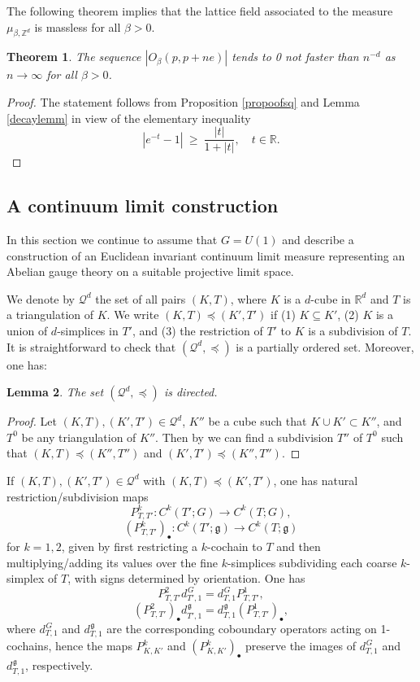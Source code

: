 \documentclass[11pt,reqno]{amsart}
\numberwithin{equation}{section}
\newtheorem{theorem}{Theorem}[section]
\newtheorem{lemma}[theorem]{Lemma}
\theoremstyle{remark}
\theoremstyle{rmdefinition}
\newcommand{\R}{{\mathbb R}}
\begin{document}
The following theorem implies that the lattice field associated to the measure $\mu_{\beta, \mathbb{Z}^d}$ is massless for all $\beta>0$.
\begin{theorem}\label{masslessth}
The sequence $|O_{\beta}(p,p+ne)|$ tends to 0 not faster than $n^{-d}$ as $n \to \infty$ for all $\beta>0$.
\end{theorem}
\begin{proof}
The statement follows from Proposition \ref{propoofsq} and Lemma \ref{decaylemm} in view of the elementary inequality
$$|e^{-t}-1|\ \ge\ \frac{|t|}{1+|t|},\quad t\in\mathbb{R}.$$
\end{proof}
	
\subsection{A continuum limit construction}
In this section we continue to assume that $G=U(1)$ and describe a construction of an Euclidean invariant continuum limit measure representing an Abelian gauge theory on a suitable projective limit space.

We denote by $\mathcal{Q}^d$ the set of all pairs $(K,T)$, where $K$ is a $d$-cube in $\R^d$ and $T$ is a triangulation of $K$. We write $(K,T)\preceq (K',T')$ if (1) $K \subseteq K'$, (2) $K$ is a union of $d$-simplices in $T'$, and (3) the restriction of $T'$ to $K$ is a subdivision of $T$. It is straightforward to check that $(\mathcal{Q}^d,\preceq)$ is a partially ordered set. Moreover, one has:
\begin{lemma}
The set $(\mathcal{Q}^d,\preceq)$ is directed.
\end{lemma}
\begin{proof}
Let $(K,T), (K',T') \in \mathcal{Q}^d$, $K''$ be a cube such that $K \cup K ' \subset K''$, and $T^0$ be any triangulation of $K''$. Then by \cite[Addendum 2.12]{RS} we can find a subdivision $T''$ of $T^0$ such that 
$(K,T)\preceq (K'',T'')$ and $(K',T')\preceq (K'',T'')$.
\end{proof}
If $(K,T), (K',T') \in \mathcal{Q}^d$ with $(K,T)\preceq (K',T')$, one has natural restriction/subdivision maps
$$ P^k_{T,T'}: C^k(T';G) \to C^k(T;G), $$
$$ (P^k_{T,T'})_{\bullet}: C^k(T';\mathfrak{g}) \to C^k(T;\mathfrak{g})$$
for $k=1,2$, given by first restricting a $k$-cochain to $T$ and then  multiplying/adding its values over the fine \(k\)-simplices subdividing each coarse \(k\)-simplex of \(T\), with signs determined by orientation. 
One has
$$P^2_{T,T'} d_{T',1}^{\hspace{1pt}G}=   d_{T,1}^{\hspace{1pt}G}P^1_{T,T'},$$
$$(P^2_{T,T'})_{\bullet}d_{T',1}^{\hspace{1pt}\mathfrak g}=d_{T,1}^{\hspace{1pt}\mathfrak g}(P^1_{T,T'})_{\bullet}, $$
where $d_{T,1}^{\hspace{1pt}G}$ and $d_{T,1}^{\hspace{1pt}\mathfrak g}$ are the corresponding coboundary operators acting on 1-cochains, hence the maps $ P^k_{K,K'}$ and $(P^k_{K,K'})_{\bullet}$
preserve the images of $d_{T,1}^{\hspace{1pt}G}$ and $d_{T,1}^{\hspace{1pt}\mathfrak g}$, respectively. 
\end{document}
